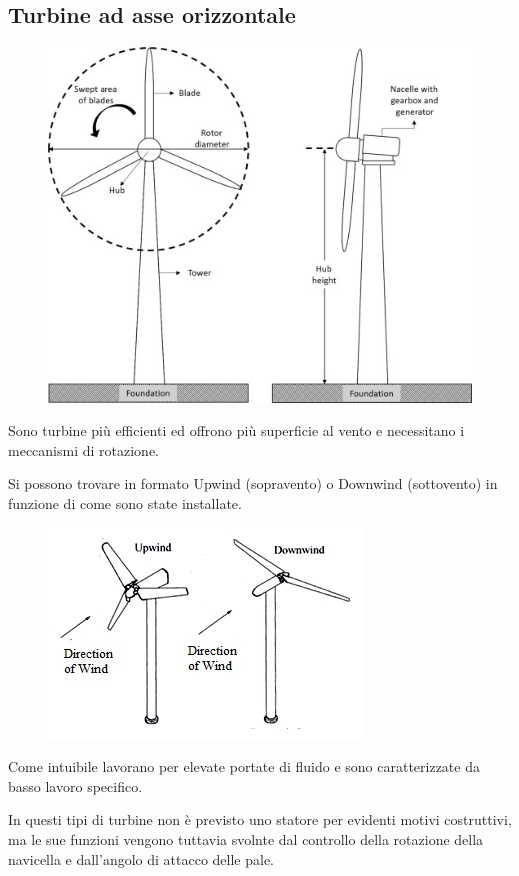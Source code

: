 \documentclass[a4paper, 15pt]{article}
\begin{document}
\subsection{Turbine ad asse orizzontale}
\begin{adjustwidth}{2in}{}
	\begin{figure}[H]
		\centering
		\includegraphics[width=0.5\linewidth]{immagini/eoliche7}
		\label{fig:eoliche7}
	\end{figure}
	Sono turbine più efficienti ed offrono più superficie al vento e necessitano i meccanismi di rotazione. 
	
	Si possono trovare in formato Upwind (sopravento) o Downwind (sottovento) in funzione di come sono state installate.
	\begin{figure}[H]
		\centering
		\includegraphics[width=0.5\linewidth]{immagini/eoliche8}
		\label{fig:eoliche8}
	\end{figure}
	Come intuibile lavorano per elevate portate di fluido e sono caratterizzate da basso lavoro specifico. 
	
	In questi tipi di turbine non è previsto uno statore per evidenti motivi costruttivi, ma le sue funzioni vengono tuttavia svolnte dal controllo della rotazione della navicella e dall'angolo di attacco delle pale. 
\end{adjustwidth}

\newpage
\end{document}
